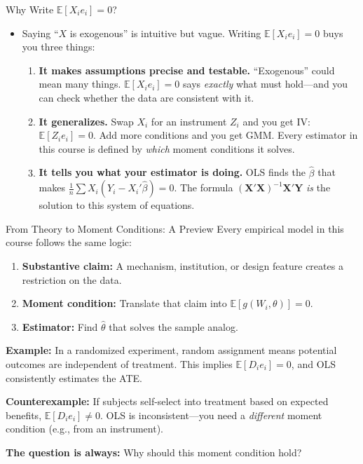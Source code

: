 \documentclass[aspectratio=169, handout, t]{beamer}
\numberwithin{equation}{section}
\begin{document}
\begin{frame}{Why Write $\mathbb{E}[X_i e_i]=0$?}
\begin{itemize}
\item Saying ``$X$ is exogenous'' is intuitive but vague.  Writing $\mathbb{E}[X_i e_i]=0$ buys you three things:\pause
\begin{enumerate}
\item \textbf{It makes assumptions precise and testable.}  ``Exogenous'' could mean many things.  $\mathbb{E}[X_i e_i]=0$ says \emph{exactly} what must hold---and you can check whether the data are consistent with it.\pause
\item \textbf{It generalizes.}  Swap $X_i$ for an instrument $Z_i$ and you get IV: $\mathbb{E}[Z_i e_i]=0$.  Add more conditions and you get GMM.  Every estimator in this course is defined by \emph{which} moment conditions it solves.\pause
\item \textbf{It tells you what your estimator is doing.}  OLS finds the $\hat{\beta}$ that makes $\frac{1}{n}\sum X_i(Y_i - X_i'\hat{\beta})=0$.  The formula $(\bm{X}'\bm{X})^{-1}\bm{X}'\bm{Y}$ \emph{is} the solution to this system of equations.
\end{enumerate}
\end{itemize}
\end{frame}


\begin{frame}{From Theory to Moment Conditions: A Preview}
Every empirical model in this course follows the same logic:
\vspace{-2pt}
\begin{tcolorbox}[colback=blue!5, colframe=blue!50]
\begin{enumerate}
\item \textbf{Substantive claim:}  A mechanism, institution, or design feature creates a restriction on the data.
\item \textbf{Moment condition:}  Translate that claim into $\mathbb{E}[g(W_i, \theta)]=0$.
\item \textbf{Estimator:}  Find $\hat{\theta}$ that solves the sample analog.
\end{enumerate}
\end{tcolorbox}

\smallskip\pause
\textbf{Example:} In a randomized experiment, random assignment means potential outcomes are independent of treatment.  This implies $\mathbb{E}[D_i e_i]=0$, and OLS consistently estimates the ATE.

\smallskip\pause
\textbf{Counterexample:} If subjects self-select into treatment based on expected benefits, $\mathbb{E}[D_i e_i]\neq 0$.  OLS is inconsistent---you need a \emph{different} moment condition (e.g., from an instrument).

\smallskip
\textbf{The question is always:} \alert{Why should this moment condition hold?}
\end{frame}
\end{document}
